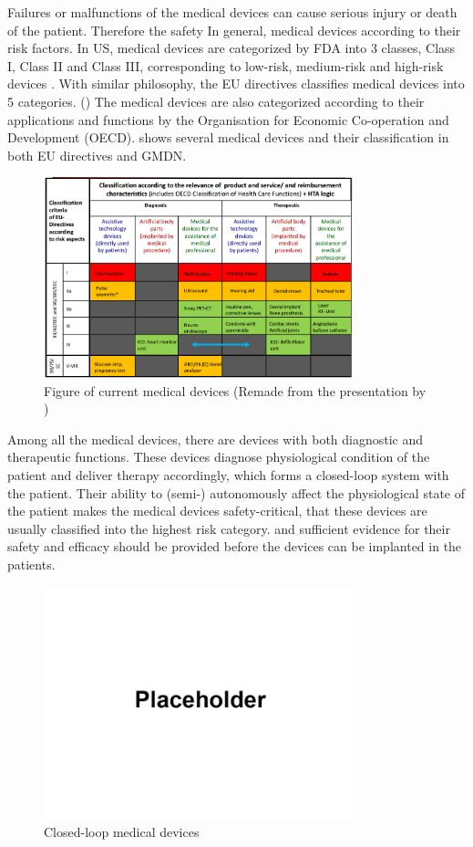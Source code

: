 Failures or malfunctions of the medical devices can cause serious injury or death of the patient. Therefore the safety
In general, medical devices according to their risk factors. In US, medical devices are categorized by FDA into 3 classes, Class I, Class II and Class III, corresponding to low-risk, medium-risk and high-risk devices \cite{class}. With similar philosophy, the EU directives classifies medical devices into 5 categories. (\cite{EU_classify}) The medical devices are also categorized according to their applications and functions by the Organisation for Economic Co-operation and Development (OECD)\cite{OECD}.  shows several medical devices and their classification in both EU directives and GMDN.
\begin{figure}[t]
		\centering
		\includegraphics[width=0.8\textwidth]{figs/devices.png}
		\caption{\small Figure of current medical devices (Remade from the presentation by \cite{classify})}
		\label{fig:Cur}
\end{figure}


Among all the medical devices, there are devices with both diagnostic and therapeutic functions. These devices diagnose physiological condition of the patient and deliver therapy accordingly, which forms a closed-loop system with the patient. Their ability to (semi-) autonomously affect the physiological state of the patient makes the medical devices safety-critical, that these devices are usually classified into the highest risk category. and sufficient evidence for their safety and efficacy should be provided before the devices can be implanted in the patients.
\begin{figure}[t]
		\centering
		\includegraphics[width=0.8\textwidth]{figs/placeholder.png}
		\caption{\small Closed-loop medical devices}
		\label{fig:closed-loop}
\end{figure}



